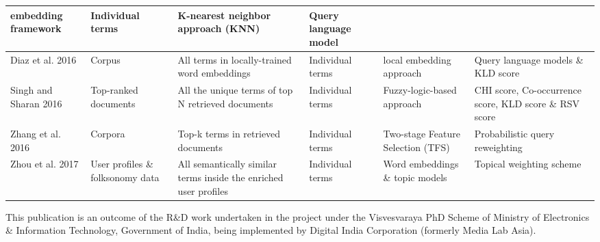 \begin{landscape}
\begin{table}
{\begin{tabular}{ | M{3cm} | M{3cm} | M{3.2cm} | M{3cm} | M{3cm} | M{3cm} |}
				embedding framework  & Individual terms & K-nearest neighbor approach (KNN) & Query language model \\ \hline
				Diaz et al. 2016 \cite{diaz2016query} & Corpus  & All terms in locally-trained
				word embeddings  & Individual terms & local embedding approach & Query language models \& KLD score \\ \hline
				Singh and Sharan 2016 \cite{singh2016new} & Top-ranked documents & All the unique terms of top N retrieved documents  & Individual terms  & Fuzzy-logic-based approach & CHI score, Co-occurrence score, KLD score \& RSV score \\ \hline
				Zhang et al. 2016 \cite{zhang2016learning} & Corpora  & Top-k terms in retrieved documents  & Individual terms  & Two-stage Feature Selection (TFS) & Probabilistic query reweighting \\ \hline
		    	Zhou et al. 2017 \cite{zhou2017query} & User profiles \& folksonomy data & All semantically similar terms inside the enriched user profiles   & Individual terms & Word embeddings \& topic models & Topical weighting scheme \\ \hline
				
				
			\end{tabular}
		}
	\end{table}
\end{landscape}


\begin{acknowledgements}
This publication is an outcome of the R\&D work undertaken in the project under the Visvesvaraya PhD Scheme of Ministry of Electronics \& Information Technology, Government of India, being implemented by Digital India Corporation (formerly Media Lab Asia).
\end{acknowledgements}



%
%





